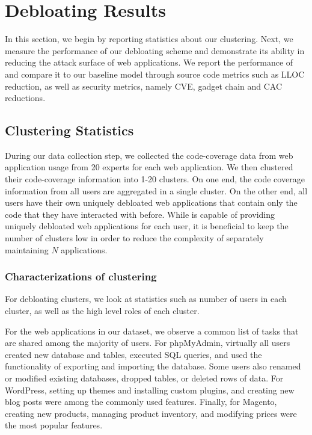 \section{Debloating Results}
\label{sec:debloatingresults}

In this section, we begin by reporting statistics about our clustering. 
Next, we measure the performance of our debloating scheme and demonstrate its ability in reducing the attack surface of web applications. 
We report the performance of \sys{} and compare it to our baseline model through source code metrics such as LLOC reduction, as well as security metrics, namely CVE, gadget chain and CAC reductions. 

\subsection{Clustering Statistics}
During our data collection step, we collected the code-coverage data from web application usage from 20 experts for each web application.
We then clustered their code-coverage information into 1-20 clusters. 
On one end, the code coverage information from all users are aggregated in a single cluster. 
On the other end, all users have their own uniquely debloated web applications that contain only the code that they have interacted with before. 
While \sys{} is capable of providing uniquely debloated web applications for each user, it is beneficial to keep the number of clusters low in order to reduce the complexity of separately maintaining $N$ applications. 

\subsubsection{Characterizations of \sys{} clustering}
For \sys{} debloating clusters, we look at statistics such as number of users in each cluster, as well as the high level roles of each cluster. 

For the web applications in our dataset, we observe a common list of tasks that are shared among the majority of users. 
For phpMyAdmin, virtually all users created new database and tables, executed SQL queries, and used the functionality of exporting and importing the database.
Some users also renamed or modified existing databases, dropped tables, or deleted rows of data. 
For WordPress, setting up themes and installing custom plugins, and creating new blog posts were among the commonly used features. 
Finally, for Magento, creating new products, managing product inventory, and modifying prices were the most popular features. 

